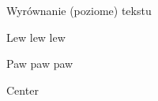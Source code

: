 \documentclass[12pt]{article}
\begin{document}
Wyrównanie (poziome) tekstu

\begin{flushleft}
Lew lew lew
\end{flushleft}

\begin{flushright}
Paw paw paw
\end{flushright}

\begin{center}
    Center
\end{center}
\end{document}
